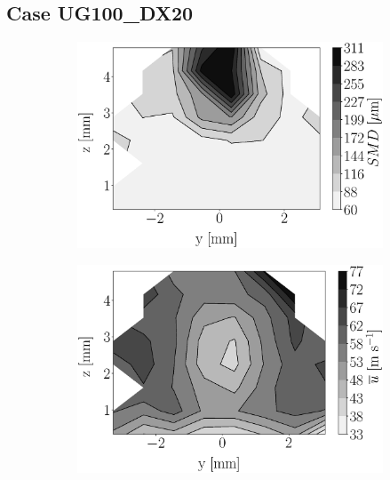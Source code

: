 \clearpage

\subsection*{Case UG100\_DX20}





\begin{figure}[h!]
\flushleft
\begin{subfigure}[b]{0.22\textwidth}
	\centering
   \includegraphics[scale=0.17]{./part2_developments/figures_ch5_resolved_JICF/injectors_SLI/uG100_dx20_x05_SMD_map.eps}
\end{subfigure}
   \hspace{0.17in}
\begin{subfigure}[b]{0.22\textwidth}
	\centering
   \includegraphics[scale=0.17]{./part2_developments/figures_ch5_resolved_JICF/injectors_SLI/uG100_dx20_x05_ux_mean_map.eps}

\end{subfigure}
\end{figure}
